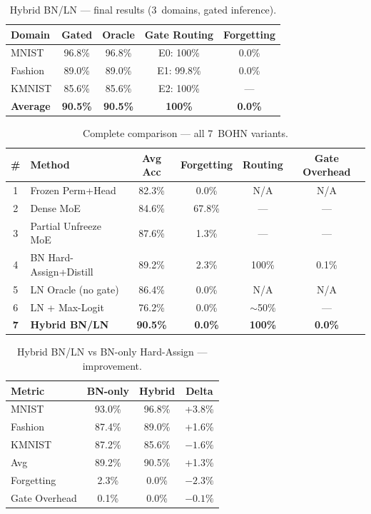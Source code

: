 \begin{table}[h]
\centering
\caption{Hybrid BN/LN --- final results (3~domains, gated inference).}
\begin{tabular}{l c c c c}
\hline
\textbf{Domain} & \textbf{Gated} & \textbf{Oracle} & \textbf{Gate Routing} & \textbf{Forgetting} \\
\hline
MNIST & 96.8\% & 96.8\% & E0: 100\% & 0.0\% \\
Fashion & 89.0\% & 89.0\% & E1: 99.8\% & 0.0\% \\
KMNIST & 85.6\% & 85.6\% & E2: 100\% & --- \\
\textbf{Average} & \textbf{90.5\%} & \textbf{90.5\%} & \textbf{100\%} & \textbf{0.0\%} \\
\hline
\end{tabular}
\end{table}

\begin{table}[h]
\centering
\caption{Complete comparison --- all 7~BOHN variants.}
\begin{tabular}{c l c c c c}
\hline
\textbf{\#} & \textbf{Method} & \textbf{Avg Acc} & \textbf{Forgetting} & \textbf{Routing} & \textbf{Gate Overhead} \\
\hline
1 & Frozen Perm+Head & 82.3\% & 0.0\% & N/A & N/A \\
2 & Dense MoE & 84.6\% & 67.8\% & --- & --- \\
3 & Partial Unfreeze MoE & 87.6\% & 1.3\% & --- & --- \\
4 & BN Hard-Assign+Distill & 89.2\% & 2.3\% & 100\% & 0.1\% \\
5 & LN Oracle (no gate) & 86.4\% & 0.0\% & N/A & N/A \\
6 & LN + Max-Logit & 76.2\% & 0.0\% & $\sim$50\% & --- \\
\textbf{7} & \textbf{Hybrid BN/LN} & \textbf{90.5\%} & \textbf{0.0\%} & \textbf{100\%} & \textbf{0.0\%} \\
\hline
\end{tabular}
\end{table}

\begin{table}[h]
\centering
\caption{Hybrid BN/LN vs BN-only Hard-Assign --- improvement.}
\begin{tabular}{l c c c}
\hline
\textbf{Metric} & \textbf{BN-only} & \textbf{Hybrid} & \textbf{Delta} \\
\hline
MNIST & 93.0\% & 96.8\% & +3.8\% \\
Fashion & 87.4\% & 89.0\% & +1.6\% \\
KMNIST & 87.2\% & 85.6\% & $-1.6\%$ \\
Avg & 89.2\% & 90.5\% & +1.3\% \\
Forgetting & 2.3\% & 0.0\% & $-2.3\%$ \\
Gate Overhead & 0.1\% & 0.0\% & $-0.1\%$ \\
\hline
\end{tabular}
\end{table}
